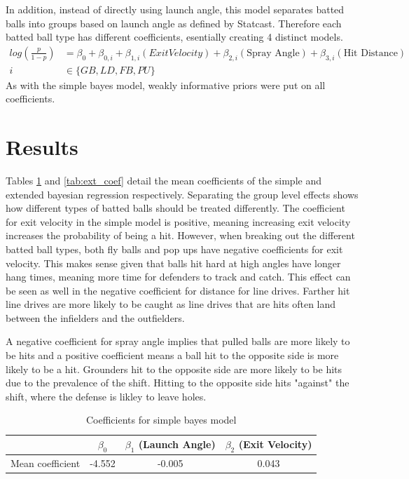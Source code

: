 \documentclass[12pt,letterpaper]{article}
\begin{document}
In addition, instead of directly using launch angle, this model separates batted balls into groups based on launch angle as defined by Statcast. Therefore each batted ball type has different coefficients, esentially creating 4 distinct models.
\begin{align*}
    log(\frac{p}{1-p}) &= \beta_0 + \beta_{0,i} + \beta_{1,i}(Exit Velocity) + \beta_{2,i}(\text{Spray Angle}) + \beta_{3,i}(\text{Hit Distance})\\
    i &\in \{GB, LD, FB, PU\}
\end{align*}
As with the simple bayes model, weakly informative priors were put on all coefficients.

\section*{Results}

Tables \ref{tab:simple_coef} and \ref{tab:ext_coef} detail the mean coefficients of the simple and extended bayesian regression respectively. Separating the group level effects shows how different types of batted balls should be treated differently. The coefficient for exit velocity in the simple model is positive, meaning increasing exit velocity increases the probability of being a hit. However, when breaking out the different batted ball types, both fly balls and pop ups have negative coefficients for exit velocity. This makes sense given that balls hit hard at high angles have longer hang times, meaning more time for defenders to track and catch. This effect can be seen as well in the negative coefficient for distance for line drives. Farther hit line drives are more likely to be caught as line drives that are hits often land between the infielders and the outfielders.

A negative coefficient for spray angle implies that pulled balls are more likely to be hits and a positive coefficient means a ball hit to the opposite side is more likely to be a hit. Grounders hit to the opposite side are more likely to be hits due to the prevalence of the shift. Hitting to the opposite side hits "against" the shift, where the defense is likley to leave holes.

\begin{table}[!htp]
    \centering
    \begin{tabular}{|r|c|c|c|}
        \hline
        & $\beta_0$ & $\beta_1$ (Launch Angle) & $\beta_2$ (Exit Velocity)\\ \hline
        Mean coefficient & -4.552 & -0.005 & 0.043 \\ \hline
    \end{tabular}
    \caption{Coefficients for simple bayes model}
    \label{tab:simple_coef}
\end{table}
\end{document}
